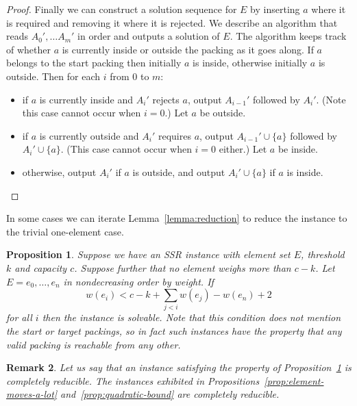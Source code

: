 \documentclass{robinminion}
\newtheorem{prop}{Proposition}
\newtheorem{rem}[prop]{Remark}
\let\union\cup
\begin{document}
\begin{proof}
    Finally we can construct a solution sequence for $E$ by inserting $a$ where it is required and removing it where it is rejected. We describe an algorithm that reads $A_0', \dots A_m'$ in order and outputs a solution of $E$. The algorithm keeps track of whether $a$ is currently inside or outside the packing as it goes along. If $a$ belongs to the start packing then initially $a$ is inside, otherwise initially $a$ is outside. Then for each $i$ from $0$ to $m$:
    \begin{itemize}
        \item if $a$ is currently inside and $A_i'$ rejects $a$, output $A_{i-1}'$ followed by $A_i'$. (Note this case cannot occur when $i=0$.) Let $a$ be outside.
        \item if $a$ is currently outside and $A_i'$ requires $a$, output $A_{i-1}'\union\{a\}$ followed by $A_i'\union\{a\}$. (This case cannot occur when $i=0$ either.) Let $a$ be inside.
        \item otherwise, output $A_i'$ if $a$ is outside, and output $A_i'\union\{a\}$ if $a$ is inside.
    \end{itemize}
\end{proof}

\noindent In some cases we can iterate Lemma~\ref{lemma:reduction} to reduce the instance to the trivial one-element case.
\begin{prop}\label{prop:iterated-reduction}
    Suppose we have an SSR instance with element set $E$, threshold $k$ and capacity $c$. Suppose further that no element weighs more than $c-k$. Let $E = {e_0, \dots, e_n}$ in nondecreasing order by weight. If
    \[
        w(e_i) < c - k + \sum_{j<i}w(e_j) - w(e_n) + 2
    \]
    for all $i$ then the instance is solvable. Note that this condition does not mention the start or target packings, so in fact such instances have the property that any valid packing is reachable from any other.
\end{prop}
\begin{rem}
    Let us say that an instance satisfying the property of Proposition~\ref{prop:iterated-reduction} is \textit{completely reducible}. The instances exhibited in Propositions~\ref{prop:element-moves-a-lot} and~\ref{prop:quadratic-bound} are completely reducible.
\end{rem}
\end{document}
